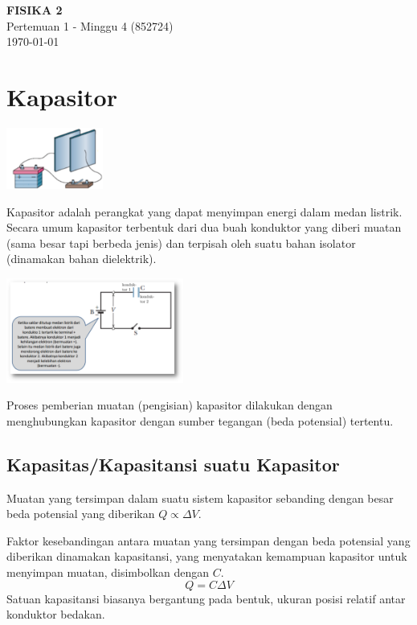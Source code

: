 \documentclass[twocolumn, 11pt]{article}%
\begin{document}
\begin{strip}
  \vspace*{\dimexpr-\stripsep}
  \begin{center}
      \Large\textbf{FISIKA 2}\\
      \large{Pertemuan 1 - Minggu 4 (852724)}\\
      \large{\today}
   \end{center}
\end{strip}

\section{Kapasitor}
    \begin{center}
        \includegraphics[width=120px]{2.png}
    \end{center}
    Kapasitor adalah perangkat yang dapat menyimpan energi dalam medan listrik. Secara umum kapasitor terbentuk dari dua buah konduktor yang diberi muatan (sama besar tapi berbeda jenis) dan terpisah oleh suatu bahan isolator (dinamakan bahan dielektrik).

    \begin{center}
        \includegraphics[width=220px]{3.png}
    \end{center}

    Proses pemberian muatan (pengisian) kapasitor dilakukan dengan menghubungkan kapasitor dengan sumber tegangan (beda potensial) tertentu.

    \subsection{Kapasitas/Kapasitansi suatu Kapasitor}%
    Muatan yang tersimpan dalam suatu sistem kapasitor sebanding dengan besar beda potensial yang diberikan $Q\propto\Delta V$.

    Faktor kesebandingan antara muatan yang tersimpan dengan beda potensial yang diberikan dinamakan kapasitansi, yang menyatakan kemampuan kapasitor untuk menyimpan muatan, disimbolkan dengan $C$.
    \[Q=C\Delta V\]
    Satuan kapasitansi biasanya bergantung pada bentuk, ukuran posisi relatif antar konduktor bedakan.
\end{document}
